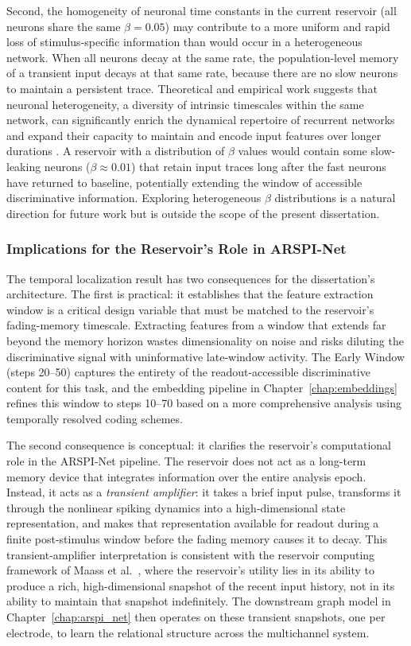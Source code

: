 Second, the homogeneity of neuronal time constants in the current reservoir (all neurons share the same $\beta = 0.05$) may contribute to a more uniform and rapid loss of stimulus-specific information than would occur in a heterogeneous network. When all neurons decay at the same rate, the population-level memory of a transient input decays at that same rate, because there are no slow neurons to maintain a persistent trace. Theoretical and empirical work suggests that neuronal heterogeneity, a diversity of intrinsic timescales within the same network, can significantly enrich the dynamical repertoire of recurrent networks and expand their capacity to maintain and encode input features over longer durations \cite{Kim2024NeuralHeterogeneity}. A reservoir with a distribution of $\beta$ values would contain some slow-leaking neurons ($\beta \approx 0.01$) that retain input traces long after the fast neurons have returned to baseline, potentially extending the window of accessible discriminative information. Exploring heterogeneous $\beta$ distributions is a natural direction for future work but is outside the scope of the present dissertation.

\subsubsection{Implications for the Reservoir's Role in ARSPI-Net}

The temporal localization result has two consequences for the dissertation's architecture. The first is practical: it establishes that the feature extraction window is a critical design variable that must be matched to the reservoir's fading-memory timescale. Extracting features from a window that extends far beyond the memory horizon wastes dimensionality on noise and risks diluting the discriminative signal with uninformative late-window activity. The Early Window (steps 20--50) captures the entirety of the readout-accessible discriminative content for this task, and the embedding pipeline in Chapter~\ref{chap:embeddings} refines this window to steps 10--70 based on a more comprehensive analysis using temporally resolved coding schemes.

The second consequence is conceptual: it clarifies the reservoir's computational role in the ARSPI-Net pipeline. The reservoir does not act as a long-term memory device that integrates information over the entire analysis epoch. Instead, it acts as a \emph{transient amplifier}: it takes a brief input pulse, transforms it through the nonlinear spiking dynamics into a high-dimensional state representation, and makes that representation available for readout during a finite post-stimulus window before the fading memory causes it to decay. This transient-amplifier interpretation is consistent with the reservoir computing framework of Maass et al.\ \cite{Maass2002RealTime}, where the reservoir's utility lies in its ability to produce a rich, high-dimensional snapshot of the recent input history, not in its ability to maintain that snapshot indefinitely. The downstream graph model in Chapter~\ref{chap:arspi_net} then operates on these transient snapshots, one per electrode, to learn the relational structure across the multichannel system.


